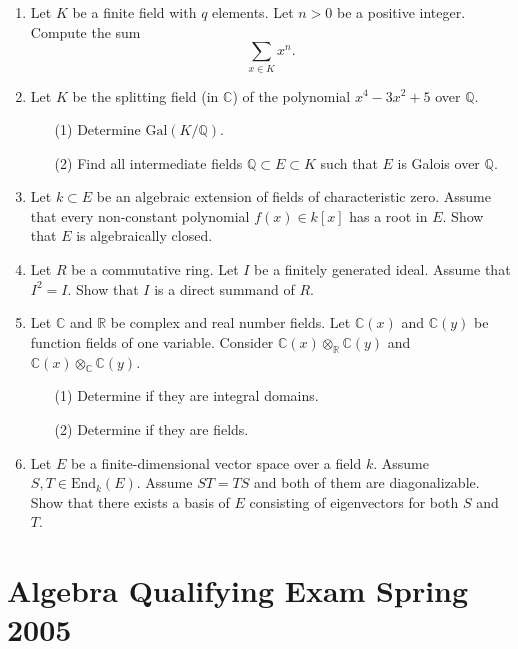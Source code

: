 \documentclass{article}
\begin{document}
\begin{enumerate}
    \item Let \(K\) be a finite field with \(q\) elements. Let \(n > 0\) be a positive integer. Compute the sum
    \[\sum_{x \in K} x^n.\]

    \item Let \(K\) be the splitting field (in \(\mathbb{C}\)) of the polynomial \(x^4 - 3x^2 + 5\) over \(\mathbb{Q}\).
    \begin{itemize}
        \item[(1)] Determine \(\text{Gal}(K/\mathbb{Q})\).
        \item[(2)] Find all intermediate fields \(\mathbb{Q} \subset E \subset K\) such that \(E\) is Galois over \(\mathbb{Q}\).
    \end{itemize}

    \item Let \(k \subset E\) be an algebraic extension of fields of characteristic zero. Assume that every non-constant polynomial \(f(x) \in k[x]\) has a root in \(E\). Show that \(E\) is algebraically closed.

    \item Let \(R\) be a commutative ring. Let \(I\) be a finitely generated ideal. Assume that \(I^2 = I\). Show that \(I\) is a direct summand of \(R\).

    \item Let \(\mathbb{C}\) and \(\mathbb{R}\) be complex and real number fields. Let \(\mathbb{C}(x)\) and \(\mathbb{C}(y)\) be function fields of one variable. Consider \(\mathbb{C}(x) \otimes_{\mathbb{R}} \mathbb{C}(y)\) and \(\mathbb{C}(x) \otimes_{\mathbb{C}} \mathbb{C}(y)\).
    \begin{itemize}
        \item[(1)] Determine if they are integral domains.
        \item[(2)] Determine if they are fields.
    \end{itemize}

    \item Let \(E\) be a finite-dimensional vector space over a field \(k\). Assume \(S, T \in \text{End}_k(E)\). Assume \(ST = TS\) and both of them are diagonalizable. Show that there exists a basis of \(E\) consisting of eigenvectors for both \(S\) and \(T\).
\end{enumerate}

\section*{Algebra Qualifying Exam Spring 2005}
\end{document}

